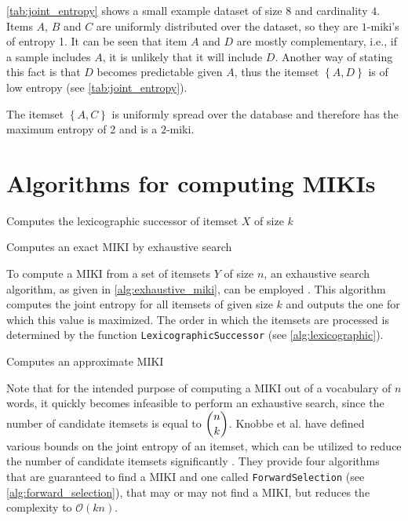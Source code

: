 \cref{tab:joint_entropy} shows a small example dataset of size $8$ and cardinality $4$. Items $A$, $B$ and $C$ are uniformly distributed over the dataset, so they are $1$-miki's of entropy \num{1}.
It can be seen that item $A$ and $D$ are mostly complementary, i.e., if a sample includes $A$, it is unlikely that it will include $D$.
Another way of stating this fact is that $D$ becomes predictable given $A$, thus the itemset $\left\{ A, D \right\}$ is of low entropy (see \cref{tab:joint_entropy}).

The itemset $\left\{ A, C \right\}$ is uniformly spread over the database and therefore has the maximum entropy of \num{2} and is a $2$-miki.




\section{Algorithms for computing MIKIs}
\label{sec:miki_computation}

\begin{algorithm}[!tbp]
    \caption{Computes the lexicographic successor of itemset $X$ of size $k$}
    \label{alg:lexicographic}
    
\end{algorithm}

\begin{algorithm}[!tbp]
    \caption{Computes an exact MIKI by exhaustive search}
    \label{alg:exhaustive_miki}
    
\end{algorithm}

To compute a MIKI from a set of itemsets $Y$ of size $n$, an exhaustive search algorithm, as given in \cref{alg:exhaustive_miki}, can be employed \citep{Knobbe2006}.
This algorithm computes the joint entropy for all itemsets of given size $k$ and outputs the one for which this value is maximized.
The order in which the itemsets are processed is determined by the function \texttt{LexicographicSuccessor} (see \cref{alg:lexicographic}).

\begin{algorithm}[!tbp]
    \caption{Computes an approximate MIKI}
    \label{alg:forward_selection}
    
\end{algorithm}

Note that for the intended purpose of computing a MIKI out of a vocabulary of $n$ words, it quickly becomes infeasible to perform an exhaustive search, since the number of candidate itemsets is equal to $\dbinom{n}{k}$.
Knobbe et al. have defined various bounds on the joint entropy of an itemset, which can be utilized to reduce the number of candidate itemsets significantly \citep{Knobbe2006}.
They provide four algorithms that are guaranteed to find a MIKI and one called \texttt{ForwardSelection} (see \cref{alg:forward_selection}), that may or may not find a MIKI, but reduces the complexity to $\mathcal{O}(kn)$.


